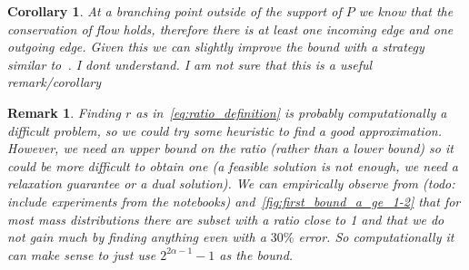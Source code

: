 \documentclass[11pt,reqno,a4paper]{amsart}
\numberwithin{equation}{section}
\theoremstyle{mytheorem}
\newtheorem{corollary}[subsection]{Corollary}
\theoremstyle{myremark}
\newtheorem{remark}[subsection]{Remark}
\theoremstyle{myparagraph}
\begin{document}
    \begin{corollary}
        At a branching point outside of the support of $P$ we know that the conservation of flow holds, therefore there is
        at least one incoming edge and one outgoing edge. Given this we can slightly improve the bound with a strategy
        similar to~\cite[Section 11]{Bernot}.
            {\color{red} I dont understand. I am not sure that this is a useful remark/corollary}
    \end{corollary}
    \begin{remark}
        Finding $r$ as in~\ref{eq:ratio_definition} is probably computationally a difficult problem, so we could try some heuristic to find a good approximation.
        However, we need an upper bound on the ratio (rather than a lower bound) so it could be more difficult to obtain one (a feasible solution is
        not enough, we need a relaxation guarantee or a dual solution). We can empirically observe from
        (todo: include experiments from the notebooks) and~\ref{fig:first_bound_a_ge_1-2} that for most mass distributions there are subset with a ratio
        close to 1 and that we do not gain much by finding anything even with a $30\%$ error.
        So computationally it can make sense to just use $2^{2\alpha - 1} - 1$ as the bound.
    \end{remark}
\end{document}
